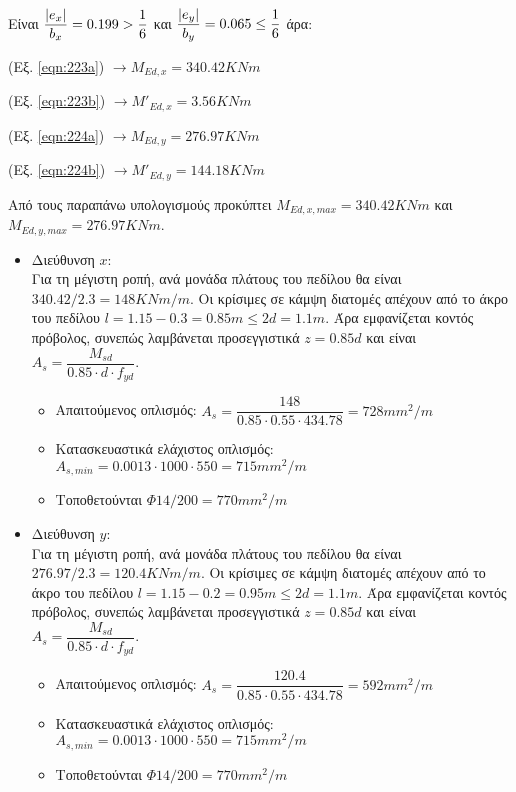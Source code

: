 \noindent
Είναι $\dfrac{\lvert e_x\rvert}{b_x} = 0.199 > \dfrac{1}{6}$ και $\dfrac{\lvert e_y\rvert}{b_y} = 0.065 \leq \dfrac{1}{6}$ άρα:

\medskip

(Eξ. \ref{eqn:223a}) $\rightarrow M_{Ed,x} = 340.42 KNm$

(Eξ. \ref{eqn:223b}) $\rightarrow M'_{Ed,x} = 3.56 KNm$

(Eξ. \ref{eqn:224a}) $\rightarrow M_{Ed,y} = 276.97 KNm$

(Eξ. \ref{eqn:224b}) $\rightarrow M'_{Ed,y} = 144.18 KNm$

\noindent
Από τους παραπάνω υπολογισμούς προκύπτει $M_{Ed,x,max} = 340.42 KNm$ και $M_{Ed,y,max} = 276.97 KNm$.

\begin{itemize}
	\item Διεύθυνση $x$:\\
	Για τη μέγιστη ροπή, ανά μονάδα πλάτους του πεδίλου θα είναι $340.42 / 2.3 = 148 KNm/m$. Οι κρίσιμες σε κάμψη διατομές απέχουν από το άκρο του πεδίλου $l = 1.15 - 0.3 = 0.85 m \leq 2d = 1.1m$. Άρα εμφανίζεται κοντός πρόβολος, συνεπώς λαμβάνεται προσεγγιστικά $z = 0.85d$ και είναι $A_s = \dfrac{M_{sd}}{0.85\cdot d \cdot f_{yd}}$.
	\begin{itemize}
		\item Απαιτούμενος οπλισμός: $A_s = \dfrac{148}{0.85\cdot0.55\cdot434.78} = 728{mm}^2 / m$
		\item Κατασκευαστικά ελάχιστος οπλισμός: $A_{s,min} = 0.0013\cdot1000\cdot550 = 715{mm}^2 / m$
		\item Τοποθετούνται $\Phi 14/200 = 770{mm}^2 / m$
	\end{itemize}
	\item Διεύθυνση $y$:\\
	Για τη μέγιστη ροπή, ανά μονάδα πλάτους του πεδίλου θα είναι $276.97 / 2.3 = 120.4 KNm/m$. Οι κρίσιμες σε κάμψη διατομές απέχουν από το άκρο του πεδίλου $l = 1.15 - 0.2 = 0.95 m \leq 2d = 1.1m$. Άρα εμφανίζεται κοντός πρόβολος, συνεπώς λαμβάνεται προσεγγιστικά $z = 0.85 d$ και είναι $A_s = \dfrac{M_{sd}}{0.85 \cdot d \cdot f_{yd}}$.
	\begin{itemize}
		\item Απαιτούμενος οπλισμός: $A_s = \dfrac{120.4}{0.85\cdot0.55\cdot434.78} = 592{mm}^2 / m$
		\item Κατασκευαστικά ελάχιστος οπλισμός: $A_{s,min} = 0.0013\cdot1000\cdot550 = 715{mm}^2 / m$
		\item Τοποθετούνται $\Phi 14/200 = 770{mm}^2 / m$
	\end{itemize}
\end{itemize}

